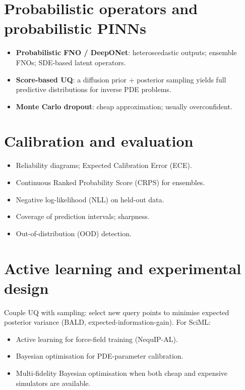 \section{Probabilistic operators and probabilistic PINNs}
\begin{itemize}
\item \textbf{Probabilistic FNO / DeepONet}: heteroscedastic outputs;
ensemble FNOs; SDE-based latent operators.
\item \textbf{Score-based UQ}: a diffusion prior + posterior sampling
yields full predictive distributions for inverse PDE problems.
\item \textbf{Monte Carlo dropout}: cheap approximation; usually
overconfident.
\end{itemize}

\section{Calibration and evaluation}
\begin{itemize}
\item Reliability diagrams; Expected Calibration Error (ECE).
\item Continuous Ranked Probability Score (CRPS) for ensembles.
\item Negative log-likelihood (NLL) on held-out data.
\item Coverage of prediction intervals; sharpness.
\item Out-of-distribution (OOD) detection.
\end{itemize}

\section{Active learning and experimental design}
Couple UQ with sampling: select new query points to minimise expected
posterior variance (BALD, expected-information-gain). For SciML:
\begin{itemize}
\item Active learning for force-field training (NequIP-AL).
\item Bayesian optimisation for PDE-parameter calibration.
\item Multi-fidelity Bayesian optimisation when both cheap and
expensive simulators are available.
\end{itemize}

